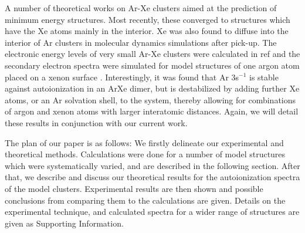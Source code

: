 \documentclass[journal=jpccck,manuscript=article]{achemso}
\begin{document}
A number of theoretical works on Ar-Xe clusters aimed at the prediction of minimum energy structures. 
Most recently, these converged to structures which have the Xe atoms mainly in the interior.\cite{marques} 
Xe was also found to diffuse into the interior of Ar clusters in molecular dynamics simulations after pick-up.\cite{Vach_1999} 
The electronic energy levels of very small Ar-Xe clusters were calculated in ref  and the secondary electron spectra were simulated for
model structures of one argon atom placed on a xenon surface \cite{Fasshauer13}.
Interestingly, it was found that Ar 3s$^{-1}$ is stable 
against autoionization in an ArXe dimer, but is destabilized by 
adding further Xe atoms, or an Ar solvation shell, to the system, thereby allowing
for combinations of argon and xenon atoms with larger interatomic distances. 
Again, we will detail these results in conjunction with our 
current work.

The plan of our paper is as follows: We firstly delineate our experimental and theoretical methods. 
Calculations were done for a number of model structures which were systematically varied, and are described in the following section.
After that, we describe and discuss our theoretical results for the autoionization spectra of the model clusters.
Experimental results are then shown and possible conclusions from comparing them to the calculations are given.
Details on the experimental technique, and calculated spectra for a wider range of structures are given as Supporting Information.

\end{document}
